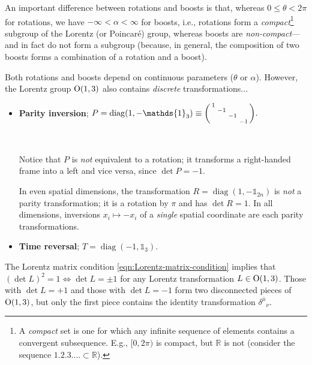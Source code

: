 \noindent
An important difference between rotations and boosts is that, whereas $0 \le θ < 2π$ for rotations, we have $-\infty < α < \infty$ for boosts, i.e., rotations form a \textit{compact}\footnote{A \textit{compact} set is one for which any infinite sequence of elements contains a convergent subsequence. E.g., $[0, 2π)$ is compact, but $\mathds{R}$ is not (consider the sequence $\qty{1, 2, 3, ...} \subset \mathds{R}$).} subgroup of the Lorentz (or Poincaré) group, whereas boosts are \textit{non-compact}---and in fact do not form a subgroup (because, in general, the composition of two boosts forms a combination of a rotation and a boost).

Both rotations and boosts depend on continuous parameters ($θ$ or $α$).
However, the Lorentz group $\mathrm{O}(1,3)$ also contains \emph{discrete} transformations...
\begin{itemize}

	\item \textbf{Parity inversion};
	\begin{math}
		P = \operatorname{diag}(1, -\mathds{1}_3) \equiv
		\smqty(1 & & & \\ & -1 & & \\ & & -1 & \\ & & & -1)
	.\end{math}

	{\centering
		
	\\}
	Notice that $P$ is \textit{not} equivalent to a rotation; it transforms a right-handed frame into a left and vice versa, since $\det P = -1$.

	\begin{note}
	In even spatial dimensions, the transformation $R = \operatorname{diag}(1, -\mathds{1}_{2n})$ is \textit{not} a parity transformation; it is a rotation by $π$ and has $\det R = 1$.
	In all dimensions, inversions $x_i \mapsto -x_i$ of a \textit{single} spatial coordinate are each parity transformations.
	\end{note}

	\item \textbf{Time reversal};
	\begin{math}
		T = \operatorname{diag}(-1, \mathds{1}_3)
	.\end{math}
\end{itemize}

The Lorentz matrix condition \eqref{eqn:Lorentz-matrix-condition} implies that $(\det L)^2 = 1 \iff \det L = \pm 1$ for any Lorentz transformation $L \in \mathrm{O}(1,3)$.
Those with $\det L = +1$ and those with $\det L = -1$ form two disconnected pieces of $\mathrm{O}(1,3)$, but only the first piece contains the identity transformation $δ^{\bar μ}{}_ν$.

